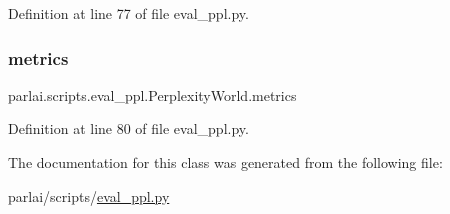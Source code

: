 Definition at line 77 of file eval\+\_\+ppl.\+py.

\mbox{\label{classparlai_1_1scripts_1_1eval__ppl_1_1PerplexityWorld_a22875b8c503fb611cb253c69f88a2a31}} 
\subsubsection{\texorpdfstring{metrics}{metrics}}
{\footnotesize\ttfamily parlai.\+scripts.\+eval\+\_\+ppl.\+Perplexity\+World.\+metrics}



Definition at line 80 of file eval\+\_\+ppl.\+py.



The documentation for this class was generated from the following file\+:\begin{DoxyCompactItemize}
\item 
parlai/scripts/\hyperlink{parlai_2scripts_2eval__ppl_8py}{eval\+\_\+ppl.\+py}\end{DoxyCompactItemize}
